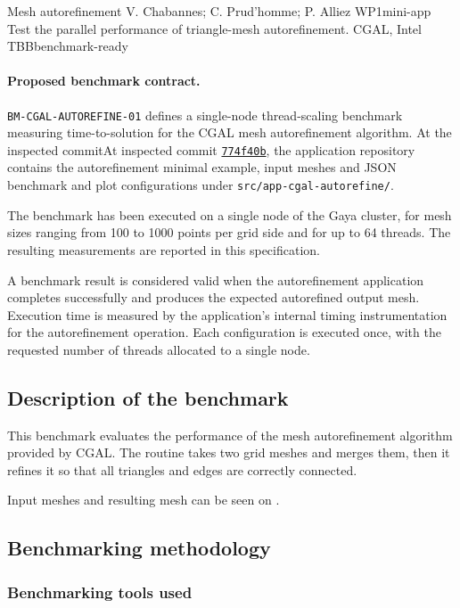 {Mesh autorefinement}
{V. Chabannes; C. Prud'homme; P. Alliez}
{WP1}{mini-app}
{Test the parallel performance of triangle-mesh autorefinement.}
{CGAL, Intel TBB}{benchmark-ready}

\paragraph{Proposed benchmark contract.}
\texttt{BM-CGAL-AUTOREFINE-01} defines a single-node thread-scaling benchmark measuring time-to-solution for the CGAL mesh autorefinement algorithm.
At the inspected commitAt inspected commit \href{https://github.com/numpex/apps-cgal/commit/774f40bb6bf2d42f08468284e55ce7e93d446b4b}{\texttt{774f40b}},
the application repository contains the autorefinement minimal example, input meshes and JSON benchmark and plot configurations under \texttt{src/app-cgal-autorefine/}.

The benchmark has been executed on a single node of the Gaya cluster, for mesh sizes ranging from 100 to 1000 points per grid side and for up to 64 threads.
The resulting measurements are reported in this specification.

A benchmark result is considered valid when the autorefinement application completes successfully and produces the expected autorefined output mesh.
Execution time is measured by the application's internal timing instrumentation for the autorefinement operation. Each configuration is executed once, with the requested number of threads allocated to a single node.


\subsection{Description of the benchmark}

This benchmark evaluates the performance of the mesh autorefinement algorithm provided by CGAL.
The routine takes two grid meshes and merges them, then it refines it so that all triangles and edges are correctly connected.

Input meshes and resulting mesh can be seen on .



\subsection{Benchmarking methodology}
\subsubsection{Benchmarking tools used}

